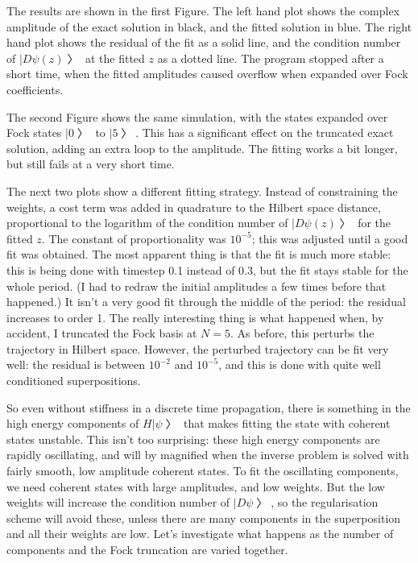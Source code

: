 The results are shown in the first Figure.  The left hand plot shows the complex amplitude of the exact solution in black, and the fitted solution in blue.  The right hand plot shows the residual of the fit as a solid line, and the condition number of $|Dψ(z)〉$ at the fitted $z$ as a dotted line.  The program stopped after a short time, when the fitted amplitudes caused overflow when expanded over Fock coefficients.  

The second Figure shows the same simulation, with the states expanded over Fock states $|0〉$ to $|5〉$.  This has a significant effect on the truncated exact solution, adding an extra loop to the amplitude.  The fitting works a bit longer, but still fails at a very short time.



The next two plots show a different fitting strategy.  Instead of constraining the weights, a cost term was added in quadrature to the Hilbert space distance, proportional to the logarithm of the condition number of $|Dψ(z)〉$ for the fitted $z$.  The constant of proportionality was $10^{-5}$; this was adjusted until a good fit was obtained.  The most apparent thing is that the fit is much more stable: this is being done with timestep 0.1 instead of 0.3, but the fit stays stable for the whole period.  (I had to redraw the initial amplitudes a few times before that happened.)  It isn't a very good fit through the middle of the period: the residual increases to order 1.  The really interesting thing is what happened when, by accident, I truncated the Fock basis at $N=5$.  As before, this perturbs the trajectory in Hilbert space.  However, the perturbed trajectory can be fit very well: the residual is between $10^{-2}$ and $10^{-5}$, and this is done with quite well conditioned superpositions.

So even without stiffness in a discrete time propagation, there is something in the high energy components of $H|ψ〉$ that makes fitting the state with coherent states unstable.  This isn't too surprising: these high energy components are rapidly oscillating, and will by magnified when the inverse problem is solved with fairly smooth, low amplitude coherent states.  To fit the oscillating components, we need coherent states with large amplitudes, and low weights.  But the low weights will increase the condition number of $|Dψ〉$, so the regularisation scheme will avoid these, unless there are many components in the superposition and all their weights are low.  Let's investigate what happens as the number of components and the Fock truncation are varied together.

